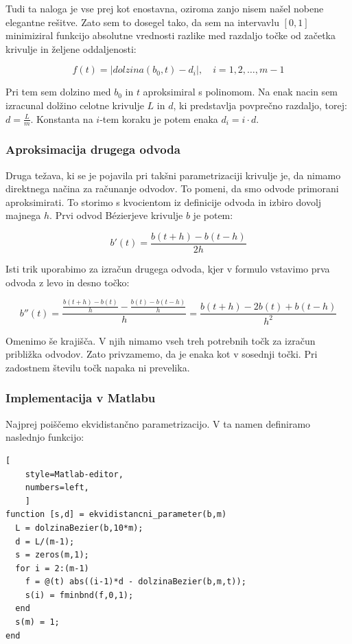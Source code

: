 \documentclass[a4paper,12pt]{article}
\begin{document}
	Tudi ta naloga je vse prej kot enostavna, oziroma zanjo nisem našel nobene elegantne rešitve. Zato sem to dosegel tako, da sem na intervavlu $[0,1]$ minimiziral funkcijo absolutne vrednosti razlike med razdaljo točke od začetka krivulje in željene oddaljenosti:
	
	$$
	f(t) = \mid dolzina(b_0,t) - d_i \mid,\quad i=1,2,\ldots,m-1
	$$
	
	Pri tem sem dolzino med $b_0$ in $t$ aproksimiral s polinomom. Na enak nacin sem izracunal dolžino celotne krivulje $L$ in $d$, ki predstavlja povprečno razdaljo, torej: $d=\frac{L}{m}$. Konstanta na $i$-tem koraku je potem enaka $d_i = i \cdot d$.
	
	\subsubsection{Aproksimacija drugega odvoda}
	
	Druga težava, ki se je pojavila pri takšni parametrizaciji krivulje je, da nimamo direktnega načina za računanje odvodov. To pomeni, da smo odvode primorani aproksimirati. To storimo s kvocientom iz definicije odvoda in izbiro dovolj majnega $h$. Prvi odvod B\'ezierjeve krivulje $b$ je potem:
	
	$$
	b'(t) = \frac{b(t+h)-b(t-h)}{2h}
	$$
	
	Isti trik uporabimo za izračun drugega odvoda, kjer v formulo vstavimo prva odvoda z levo in desno točko:
	
	$$
	b''(t) = \frac{\frac{b(t+h)-b(t)}{h} - \frac{b(t)-b(t-h)}{h}}{h} = \frac{b(t+h)-2b(t)+b(t-h)}{h^2}
	$$
	
	Omenimo še krajišča. V njih nimamo vseh treh potrebnih točk za izračun približka odvodov. Zato privzamemo, da je enaka kot v sosednji točki. Pri zadostnem številu točk napaka ni prevelika.
	
	\subsubsection{Implementacija v Matlabu}
	
	Najprej poiščemo ekvidistančno parametrizacijo. V ta namen definiramo naslednjo funkcijo:
	
	\begin{lstlisting}[
	style=Matlab-editor,
	numbers=left,
	]
function [s,d] = ekvidistancni_parameter(b,m)
  L = dolzinaBezier(b,10*m);
  d = L/(m-1);
  s = zeros(m,1);
  for i = 2:(m-1)
    f = @(t) abs((i-1)*d - dolzinaBezier(b,m,t));
    s(i) = fminbnd(f,0,1);   
  end
  s(m) = 1;
end
	\end{lstlisting}
	
\end{document}
